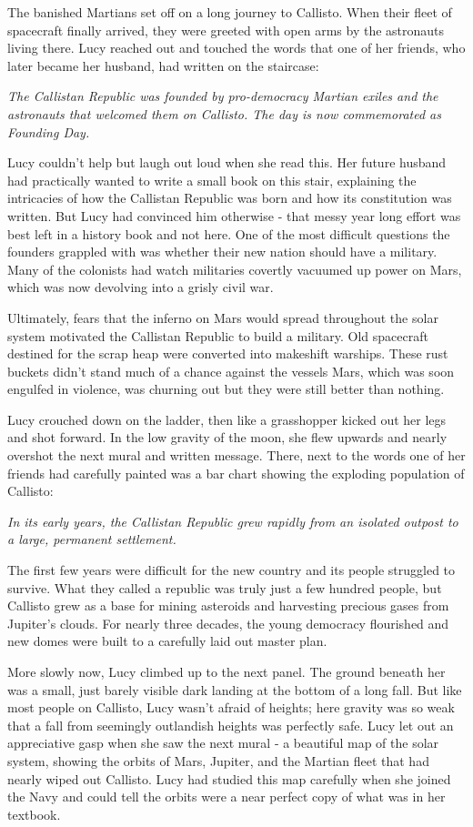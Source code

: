 \documentclass[12pt]{article} %
\begin{document}
The banished Martians set off on a long journey to Callisto. When their fleet of spacecraft finally arrived, they were greeted with open arms by the astronauts living there. Lucy reached out and touched the words that one of her friends, who later became her husband, had written on the staircase:

\textit{The Callistan Republic was founded by pro-democracy Martian exiles and the astronauts that welcomed them on Callisto. The day is now commemorated as Founding Day.}

Lucy couldn't help but laugh out loud when she read this. Her future husband had practically wanted to write a small book on this stair, explaining the intricacies of how the Callistan Republic was born and how its constitution was written. But Lucy had convinced him otherwise - that messy year long effort was best left in a history book and not here. One of the most difficult questions the founders grappled with was whether their new nation should have a military. Many of the colonists had watch militaries covertly vacuumed up power on Mars, which was now devolving into a grisly civil war.

Ultimately, fears that the inferno on Mars would spread throughout the solar system motivated the Callistan Republic to build a military. Old spacecraft destined for the scrap heap were converted into makeshift warships. These rust buckets didn't stand much of a chance against the vessels Mars, which was soon engulfed in violence, was churning out but they were still better than nothing.

Lucy crouched down on the ladder, then like a grasshopper kicked out her legs and shot forward. In the low gravity of the moon, she flew upwards and nearly overshot the next mural and written message. There, next to the words one of her friends had carefully painted was a bar chart showing the exploding population of Callisto: 

\textit{In its early years, the Callistan Republic grew rapidly from an isolated outpost to a large, permanent settlement.}

The first few years were difficult for the new country and its people struggled to survive. What they called a republic was truly just a few hundred people, but Callisto grew as a base for mining asteroids and harvesting precious gases from Jupiter's clouds. For nearly three decades, the young democracy flourished and new domes were built to a carefully laid out master plan.

More slowly now, Lucy climbed up to the next panel. The ground beneath her was a small, just barely visible dark landing at the bottom of a long fall. But like most people on Callisto, Lucy wasn't afraid of heights; here gravity was so weak that a fall from seemingly outlandish heights was perfectly safe. Lucy let out an appreciative gasp when she saw the next mural - a beautiful map of the solar system, showing the orbits of Mars, Jupiter, and the Martian fleet that had nearly wiped out Callisto. Lucy had studied this map carefully when she joined the Navy and could tell the orbits were a near perfect copy of what was in her textbook.
\end{document}
